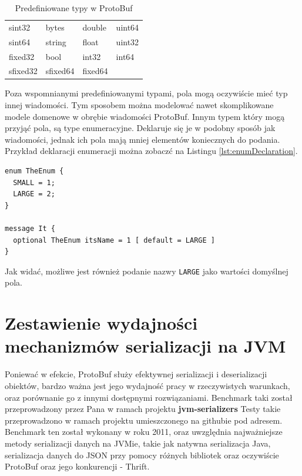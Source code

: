 \begin{table}
\begin{center}
\begin{tabular}{llll}
sint32 & bytes & double & uint64\\
sint64 & string & float & uint32\\
fixed32 & bool & int32 & int64 \\
sfixed32 & sfixed64 & fixed64 &  \\
\end{tabular}
\end{center}
\caption{Predefiniowane typy w ProtoBuf}
\label{protoTupes_all}
\end{table}

Poza wspomnianymi predefiniowanymi typami, pola mogą oczywiście mieć typ innej wiadomości. Tym sposobem można modelować nawet skomplikowane modele domenowe
w obrębie wiadomości ProtoBuf. Innym typem który mogą przyjąć pola, są type enumeracyjne. Deklaruje się je w podobny sposób jak wiadomości, jednak 
ich pola mają mniej elementów koniecznych do podania. Przykład deklaracji enumeracji można zobaczć na Listingu \ref{lst:enumDeclaration}.

\begin{lstlisting}[caption={Deklaracja oraz zastosowanie typu enumeracyjnego}, label={lst:enumDeclaration}]
enum TheEnum {
  SMALL = 1;
  LARGE = 2;
}

message It {
  optional TheEnum itsName = 1 [ default = LARGE ]
}
\end{lstlisting}

Jak widać, możliwe jest również podanie nazwy \verb|LARGE| jako wartości domyślnej pola.


\section{Zestawienie wydajności mechanizmów serializacji na JVM}
\label{sec:serialization_speed}

Poniewać w efekcie, ProtoBuf służy efektywnej serializacji i deserializacji obiektów, bardzo ważna jest jego wydajność pracy 
w rzeczywistych warunkach, oraz porównanie go z innymi dostępnymi rozwiązaniami. Benchmark taki został przeprowadzony przez Pana
w ramach projektu \textbf{jvm-serializers} \cite{JVMSerializers}
Testy takie przeprowadzono w ramach projektu umieszczonego na githubie pod adresem.
Benchmark \cite{proto_benchmark} ten został wykonany w roku 2011, oraz uwzględnia najważniejsze metody serializacji danych na JVMie, takie jak
natywna serializacja Java, serializacja danych do JSON przy pomocy różnych bibliotek oraz oczywiście ProtoBuf oraz jego konkurencji - Thrift.

